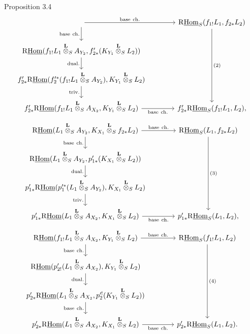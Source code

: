 \begin{statement}{Proposition 3.4}
\[\begin{tikzcd}[column sep=3.7em,row sep=1.7em]
  \arrow[r,"\mathrm{base\ ch.}"] \arrow[d,"\mathrm{base\ ch.}"']
& \mathrm{R}\underline{\mathrm{Hom}}_S(f_{1!}L_1,f_{2*}L_2) \arrow[ddd,"(2)"] \\
\mathrm{R}\underline{\mathrm{Hom}}(f_{1!}L_1\overset{\mathbf L}{\otimes}_S A_{Y_2},f'_{2*}(K_{Y_1}\overset{\mathbf L}{\otimes}_S L_2)) \arrow[d,"\mathrm{dual.}"']
& \\
f'_{2*}\mathrm{R}\underline{\mathrm{Hom}}(f_2'^*(f_{1!}L_1\overset{\mathbf L}{\otimes}_S A_{Y_2}),K_{Y_1}\overset{\mathbf L}{\otimes}_S L_2) \arrow[d,"\mathrm{triv.}"']
& \\
f'_{2*}\mathrm{R}\underline{\mathrm{Hom}}(f_{1!}L_1\overset{\mathbf L}{\otimes}_S A_{X_2},K_{Y_1}\overset{\mathbf L}{\otimes}_S L_2) \arrow[r,"\mathrm{base\ ch.}"']
& f'_{2*}\mathrm{R}\underline{\mathrm{Hom}}_S(f_{1!}L_1,L_2),
\end{tikzcd}
\]
\[
\begin{tikzcd}[column sep=3.7em,row sep=1.7em]
\mathrm{R}\underline{\mathrm{Hom}}(L_1\overset{\mathbf L}{\otimes}_S A_{Y_2},K_{X_1}\overset{\mathbf L}{\otimes}_S f_{2*}L_2)
  \arrow[r,"\mathrm{base\ ch.}"] \arrow[d,"\mathrm{base\ ch.}"']
& \mathrm{R}\underline{\mathrm{Hom}}_S(L_1,f_{2*}L_2) \arrow[ddd,"(3)"] \\
\mathrm{R}\underline{\mathrm{Hom}}(L_1\overset{\mathbf L}{\otimes}_S A_{Y_2},p'_{1*}(K_{X_1}\overset{\mathbf L}{\otimes}_S L_2)) \arrow[d,"\mathrm{dual.}"']
& \\
p'_{1*}\mathrm{R}\underline{\mathrm{Hom}}(p_1'^*(L_1\overset{\mathbf L}{\otimes}_S A_{Y_2}),K_{X_1}\overset{\mathbf L}{\otimes}_S L_2) \arrow[d,"\mathrm{triv.}"']
& \\
p'_{1*}\mathrm{R}\underline{\mathrm{Hom}}(L_1\overset{\mathbf L}{\otimes}_S A_{X_2},K_{X_1}\overset{\mathbf L}{\otimes}_S L_2) \arrow[r,"\mathrm{base\ ch.}"']
& p'_{1*}\mathrm{R}\underline{\mathrm{Hom}}_S(L_1,L_2),
\end{tikzcd}
\]
\[
\begin{tikzcd}[column sep=3.7em,row sep=1.7em]
\mathrm{R}\underline{\mathrm{Hom}}(f_{1!}L_1\overset{\mathbf L}{\otimes}_S A_{X_2},K_{Y_1}\overset{\mathbf L}{\otimes}_S L_2)
  \arrow[r,"\mathrm{base\ ch.}"] \arrow[d,"\mathrm{base\ ch.}"']
& \mathrm{R}\underline{\mathrm{Hom}}_S(f_{1!}L_1,L_2) \arrow[ddd,"(4)"] \\
\mathrm{R}\underline{\mathrm{Hom}}(p'_{2!}(L_1\overset{\mathbf L}{\otimes}_S A_{X_2}),K_{Y_1}\overset{\mathbf L}{\otimes}_S L_2) \arrow[d,"\mathrm{dual.}"']
& \\
p'_{2*}\mathrm{R}\underline{\mathrm{Hom}}(L_1\overset{\mathbf L}{\otimes}_S A_{X_2},p_2'^!(K_{Y_1}\overset{\mathbf L}{\otimes}_S L_2)) \arrow[d,"\mathrm{base\ ch.}"']
& \\
p'_{2*}\mathrm{R}\underline{\mathrm{Hom}}(L_1\overset{\mathbf L}{\otimes}_S A_{X_2},K_{X_1}\overset{\mathbf L}{\otimes}_S L_2) \arrow[r,"\mathrm{base\ ch.}"']
& p'_{2*}\mathrm{R}\underline{\mathrm{Hom}}_S(L_1,L_2).
\end{tikzcd}
\]
\end{statement}
